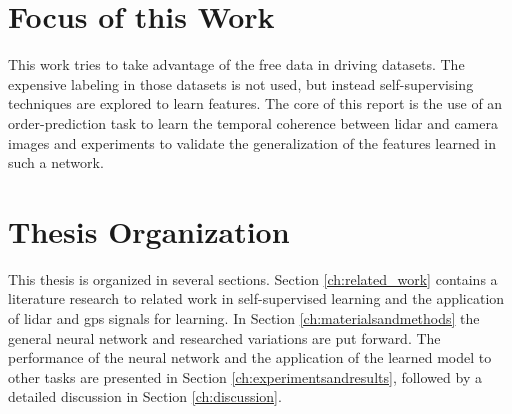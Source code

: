 \section{Focus of this Work}
This work tries to take advantage of the free data in driving datasets. The expensive labeling in those datasets is not used, but instead self-supervising techniques are explored to learn features. The core of this report is the use of an order-prediction task to learn the temporal coherence between lidar and camera images and experiments to validate the generalization of the features learned in such a network.

\section{Thesis Organization}
This thesis is organized in several sections. Section \ref{ch:related_work} contains a literature research to related work in self-supervised learning and the application of lidar and gps signals for learning. In Section \ref{ch:materialsandmethods} the general neural network and researched variations are put forward. The performance of the neural network and the application of the learned model to other tasks are presented in Section \ref{ch:experimentsandresults}, followed by a detailed discussion in Section \ref{ch:discussion}.
